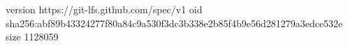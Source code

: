 version https://git-lfs.github.com/spec/v1
oid sha256:abf89b43324277f80a84c9a530f3dc3b338e2b85f4b9e56d281279a3edce532e
size 1128059
